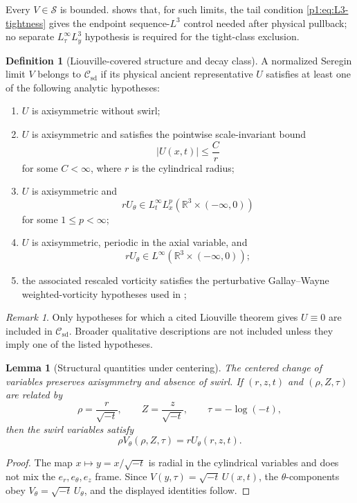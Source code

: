 \documentclass[11pt]{amsart}
\theoremstyle{plain}
\newtheorem{lemma}[lemma]{Lemma}
\theoremstyle{definition}
\newtheorem{definition}[definition]{Definition}
\theoremstyle{remark}
\newtheorem{remark}[remark]{Remark}
\numberwithin{equation}{section}
\newcommand{\R}{\mathbb R}
\newcommand{\calS}{\mathcal S}
\newcommand{\calC}{\mathcal C}
\begin{document}
Every \(V\in\calS\) is bounded.   shows that, for such limits, the
tail condition \eqref{p1:eq:L3-tightness} gives the endpoint sequence-\(L^3\)
control needed after physical pullback; no separate
\(L^\infty_\tau L^3_y\) hypothesis is required for the tight-class exclusion.

\begin{definition}[Liouville-covered structure and decay class]
\label{p1:def:known-structure-decay-class}
A normalized Seregin limit \(V\) belongs to \(\calC_{\mathrm{sd}}\) if its
physical ancient representative \(U\) satisfies at least one of the following
analytic hypotheses:
\begin{enumerate}[label=(\roman*)]
\item \(U\) is axisymmetric without swirl;
\item \(U\) is axisymmetric and satisfies the pointwise scale-invariant bound
\[
   |U(x,t)|\le \frac{C}{r}
\]
for some \(C<\infty\), where \(r\) is the cylindrical radius;
\item \(U\) is axisymmetric and
\[
   rU_\theta\in L_t^\infty L_x^p(\R^3\times(-\infty,0))
\]
for some \(1\le p<\infty\);
\item \(U\) is axisymmetric, periodic in the axial variable, and
\[
   rU_\theta\in L^\infty(\R^3\times(-\infty,0));
\]
\item the associated rescaled vorticity satisfies the perturbative
Gallay--Wayne weighted-vorticity hypotheses used in
;
\end{enumerate}
\end{definition}

\begin{remark}
Only hypotheses for which a cited Liouville theorem gives \(U\equiv0\) are
included in \(\calC_{\mathrm{sd}}\).  Broader qualitative descriptions are
not included unless they imply one of the listed hypotheses.
\end{remark}

\begin{lemma}[Structural quantities under centering]
\label{p1:lem:structure-centering}
The centered change of variables preserves axisymmetry and absence of swirl.
If \((r,z,t)\) and \((\rho,Z,\tau)\) are related by
\[
   \rho=\frac r{\sqrt{-t}},\qquad Z=\frac z{\sqrt{-t}},
   \qquad \tau=-\log(-t),
\]
then the swirl variables satisfy
\[
   \rho V_\theta(\rho,Z,\tau)=rU_\theta(r,z,t).
\]
\end{lemma}

\begin{proof}
The map \(x\mapsto y=x/\sqrt{-t}\) is radial in the cylindrical variables and
does not mix the \(e_r,e_\theta,e_z\) frame.  Since
\(V(y,\tau)=\sqrt{-t}\,U(x,t)\), the \(\theta\)-components obey
\(V_\theta=\sqrt{-t}\,U_\theta\), and the displayed identities follow.
\end{proof}
\end{document}
